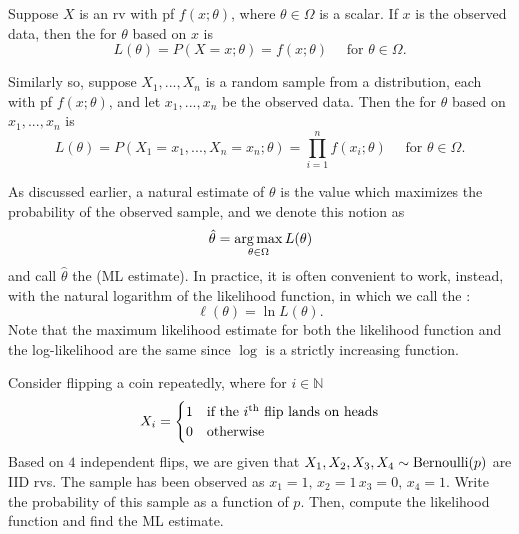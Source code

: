 \documentclass[notoc,notitlepage]{tufte-book}
\begin{document}
\begin{defn}
\label{defn:likelihood_function}
  Suppose $X$ is an rv with pf $f(x; \theta)$, where $\theta \in \Omega$ is a scalar. If $x$ is the observed data, then the  for $\theta$ based on $x$ is
  \begin{equation*}
    L(\theta) = P(X = x; \theta) = f(x; \theta) \quad \text{ for } \theta \in \Omega.
  \end{equation*}

  Similarly so, suppose $X_1, ..., X_n$ is a random sample from a distribution, each with pf $f(x; \theta)$, and let $x_1, ..., x_n$ be the observed data. Then the  for $\theta$ based on $x_1, ..., x_n$ is
  \begin{equation*}
    L(\theta) = P(X_1 = x_1, ..., X_n = x_n ; \theta) = \prod_{i=1}^{n} f(x_i; \theta) \quad \text{ for } \theta \in \Omega.
  \end{equation*}
\end{defn}

\begin{note}
  As discussed earlier, a natural estimate of $\theta$ is the value which maximizes the probability of the observed sample, and we denote this notion as
  \begin{equation*}
    \hat{\theta} = \operatorname*{arg\,max}_{\theta \in \Omega} L(\theta)
  \end{equation*}
  and call $\hat{\theta}$ the  (ML estimate). In practice, it is often convenient to work, instead, with the natural logarithm of the likelihood function, in which we call the :
  \begin{equation*}
    \ell(\theta) = \ln L(\theta).
  \end{equation*}
  Note that the maximum likelihood estimate for both the likelihood function and the log-likelihood are the same since $\log$ is a strictly increasing function.
\end{note}

\begin{eg}[Example 6.1]\label{eg:6_1}
  Consider flipping a coin repeatedly, where for $i \in \mathbb{N}$
  \begin{equation*}
    X_i = \begin{cases}
      1 & \text{if the } i \text{\textsuperscript{th} flip lands on heads} \\
      0 & \text{otherwise}
    \end{cases}
  \end{equation*}
  Based on $4$ independent flips, we are given that $X_1, X_2, X_3, X_4 \sim \operatorname{Bernoulli}(p)$ are IID rvs. The sample has been observed as $x_1 = 1, \, x_2 = 1 \, x_3 = 0, \, x_4 = 1$. Write the probability of this sample as a function of $p$. Then, compute the likelihood function and find the ML estimate.
\end{eg}
\end{document}
